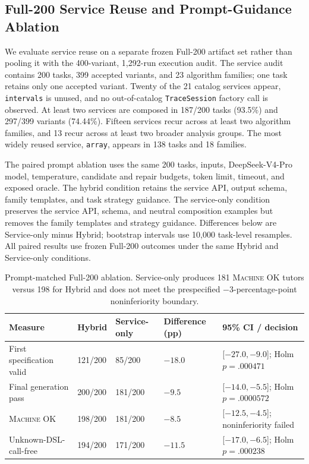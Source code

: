 \documentclass[letterpaper]{article}
\newcommand{\machineok}{\textsc{Machine OK}}
\begin{document}
\FloatBarrier

\subsection{Full-200 Service Reuse and Prompt-Guidance Ablation}
\label{sec:service-ablation}

We evaluate service reuse on a separate frozen Full-200 artifact set
rather than pooling it with the 400-variant, 1,292-run execution
audit. The service audit contains 200 tasks, 399 accepted variants, and
23 algorithm families; one task retains only one accepted variant.
Twenty of the 21 catalog services appear, \texttt{intervals} is unused,
and no out-of-catalog \texttt{TraceSession} factory call is observed.
At least two services are composed in 187/200 tasks (93.5\%) and
297/399 variants (74.44\%). Fifteen services recur across at least two
algorithm families, and 13 recur across at least two broader analysis
groups. The most widely reused service, \texttt{array}, appears in 138
tasks and 18 families.

The paired prompt ablation uses the same 200 tasks, inputs,
DeepSeek-V4-Pro model, temperature, candidate and repair budgets, token
limit, timeout, and exposed oracle. The hybrid condition retains the
service API, output schema, family templates, and task strategy
guidance. The service-only condition preserves the service API, schema,
and neutral composition examples but removes the family templates and
strategy guidance. Differences below are Service-only minus Hybrid;
bootstrap intervals use 10,000 task-level resamples.
All paired results use frozen Full-200 outcomes under the same Hybrid
and Service-only conditions.

\begin{table}[t]
\centering
\small
\setlength{\tabcolsep}{4pt}
\begin{tabular}{@{}p{}p{}p{}p{}p{}@{}}
\toprule
Measure & Hybrid & Service-only & Difference (pp) & 95\% CI / decision \\
\midrule
First specification valid & 121/200 & 85/200 & $-18.0$ & [$-27.0,-9.0$]; Holm $p=.000471$ \\
Final generation pass & 200/200 & 181/200 & $-9.5$ & [$-14.0,-5.5$]; Holm $p=.0000572$ \\
\machineok{} & 198/200 & 181/200 & $-8.5$ & [$-12.5,-4.5$]; noninferiority failed \\
Unknown-DSL-call-free & 194/200 & 171/200 & $-11.5$ & [$-17.0,-6.5$]; Holm $p=.000238$ \\
\bottomrule
\end{tabular}
\caption{Prompt-matched Full-200 ablation. Service-only produces 181 \machineok{} tutors versus 198 for Hybrid and does not meet the prespecified $-3$-percentage-point noninferiority boundary.}
\label{tab:service-prompt-ablation}
\end{table}
\end{document}
